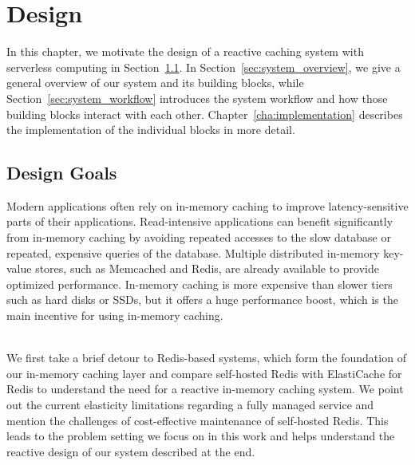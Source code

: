 \chapter{Design}
\label{cha:design}
In this chapter, we motivate the design of a reactive caching system with serverless computing in Section~\ref{sec:system_goals}. In Section~\ref{sec:system_overview}, we give a general overview of our system and its building blocks, while Section~\ref{sec:system_workflow} introduces the system workflow and how those building blocks interact with each other. Chapter~\ref{cha:implementation} describes the implementation of the individual blocks in more detail.


\section{Design Goals}
\label{sec:system_goals}
Modern applications often rely on in-memory caching to improve latency-sensitive parts of their applications. Read-intensive applications can benefit significantly from in-memory caching by avoiding repeated accesses to the slow database or repeated, expensive queries of the database. Multiple distributed in-memory key-value stores, such as Memcached and Redis, are already available to provide optimized performance. In-memory caching is more expensive than slower tiers such as hard disks or SSDs, but it offers a huge performance boost, which is the main incentive for using in-memory caching. 

~\\
We first take a brief detour to Redis-based systems, which form the foundation of our in-memory caching layer and compare self-hosted Redis with ElastiCache for Redis to understand the need for a reactive in-memory caching system. We point out the current elasticity limitations regarding a fully managed service and mention the challenges of cost-effective maintenance of self-hosted Redis. This leads to the problem setting we focus on in this work and helps understand the reactive design of our system described at the end. 

